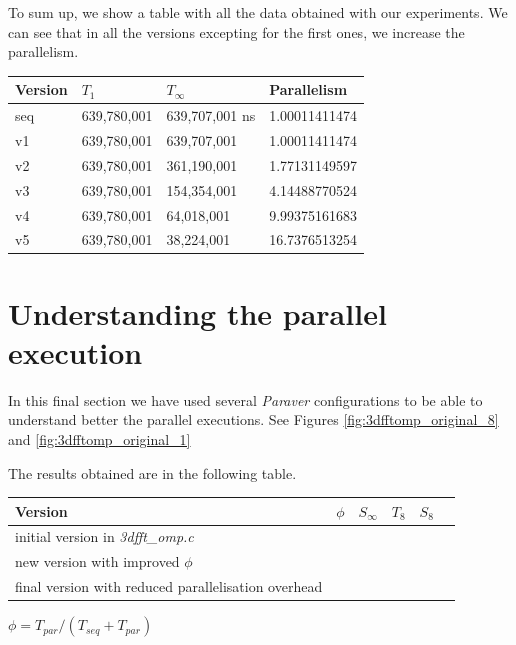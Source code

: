 \documentclass[12]{article}
\begin{document}
To sum up, we show a table with all the data obtained with our experiments. We can see that in all the versions excepting for the first ones, we increase the parallelism.
\\
\medskip
\begin{table}[H]
\centering
\begin{tabular}{|l|l|l|l|}
\hline
Version & $T_1 $ & $T_\infty$ & Parallelism \\ \hline
seq     & 639,780,001   & 639,707,001 ns   &        1.00011411474     \\ \hline
v1      &  639,780,001  & 639,707,001  &         1.00011411474      \\ \hline
v2      & 639,780,001   & 361,190,001   &      1.77131149597      \\ \hline
v3      & 639,780,001   & 154,354,001&         4.14488770524    \\ \hline
v4      & 639,780,001   &  64,018,001   &        9.99375161683     \\ \hline
v5      &639,780,001     & 38,224,001  &        16.7376513254    \\ \hline
\end{tabular}
\end{table}

\section{Understanding the parallel execution}
In this final section we have used several \textit{Paraver} configurations to be able to understand better the parallel executions. See Figures \ref{fig:3dfftomp_original_8} and \ref{fig:3dfftomp_original_1}

The results obtained are in the following table.
\begin{table}[H]
\begin{tabular}{|l|l|l|l|l|l|}
\hline \textbf{Version} & $\phi $ & $S_\infty$ & $T_8$ & $S_8$ \\ \hline
initial version in \textit{3dfft\_omp.c} & & & & \\ \hline
new version with improved $\phi$ & & & & \\ \hline
final version with reduced parallelisation overhead & & & &  \\ \hline

\end{tabular}
\begin{center}
$\phi = T_{par} / (T_{seq} + T_{par}) $
\end{center}
\end{table}
\end{document}
